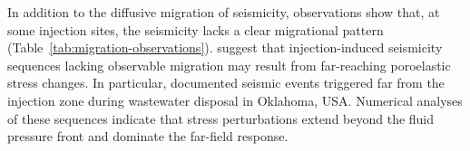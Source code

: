 \documentclass[draft]{agujournal2019}
\begin{document}

In addition to the diffusive migration of seismicity, observations show that, at some injection sites, the seismicity lacks a clear migrational pattern (Table~\ref{tab:migration-observations}).  suggest that injection-induced seismicity sequences lacking observable migration may result from far-reaching poroelastic stress changes. In particular,  documented seismic events triggered far from the injection zone during wastewater disposal in Oklahoma, USA\@. Numerical analyses of these sequences indicate that stress perturbations extend beyond the fluid pressure front and dominate the far-field response.
\end{document}
